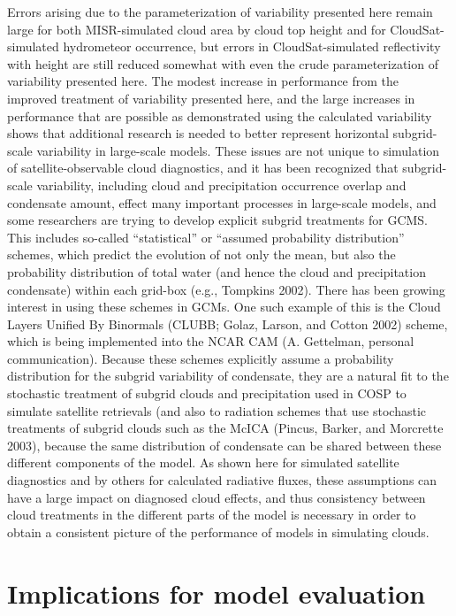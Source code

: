Errors arising due to the parameterization of variability presented here
remain large for both MISR-simulated cloud area by cloud top height and
for CloudSat-simulated hydrometeor occurrence, but errors in
CloudSat-simulated reflectivity with height are still reduced somewhat
with even the crude parameterization of variability presented here. The
modest increase in performance from the improved treatment of
variability presented here, and the large increases in performance that
are possible as demonstrated using the calculated variability shows that
additional research is needed to better represent horizontal
subgrid-scale variability in large-scale models. These issues are not
unique to simulation of satellite-observable cloud diagnostics, and it
has been recognized that subgrid-scale variability, including cloud and
precipitation occurrence overlap and condensate amount, effect many
important processes in large-scale models, and some researchers are
trying to develop explicit subgrid treatments for GCMS. This includes
so-called ``statistical'' or ``assumed probability distribution''
schemes, which predict the evolution of not only the mean, but also the
probability distribution of total water (and hence the cloud and
precipitation condensate) within each grid-box (e.g., Tompkins 2002).
There has been growing interest in using these schemes in GCMs. One such
example of this is the Cloud Layers Unified By Binormals (CLUBB; Golaz,
Larson, and Cotton 2002) scheme, which is being implemented into the
NCAR CAM (A. Gettelman, personal communication). Because these schemes
explicitly assume a probability distribution for the subgrid variability
of condensate, they are a natural fit to the stochastic treatment of
subgrid clouds and precipitation used in COSP to simulate satellite
retrievals (and also to radiation schemes that use stochastic treatments
of subgrid clouds such as the McICA (Pincus, Barker, and Morcrette
2003), because the same distribution of condensate can be shared between
these different components of the model. As shown here for simulated
satellite diagnostics and by others for calculated radiative fluxes,
these assumptions can have a large impact on diagnosed cloud effects,
and thus consistency between cloud treatments in the different parts of
the model is necessary in order to obtain a consistent picture of the
performance of models in simulating clouds.

\chapter{Implications for model evaluation}\label{sec:cmip5ux5fchapter}

